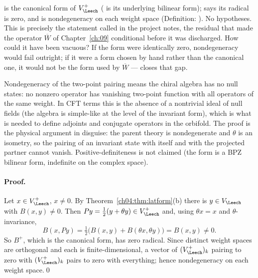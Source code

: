 \begin{dictionary}
 is the canonical form of $V_\Leech^+$ ( is its underlying bilinear
form);  says its radical is zero, and  is
nondegeneracy on each weight space (Definition: ). No hypotheses. This is
precisely the statement called  in the project notes, the residual that made the operator
$\overline W$ of Chapter~\ref{ch:09} conditional before it was discharged. How could it have been
vacuous? If the form were identically zero, nondegeneracy would fail outright; if it were a form
chosen by hand rather than the canonical one, it would not be the form used by $\overline W$ ---
 closes that gap.
\end{dictionary}

\begin{physics}
Nondegeneracy of the two-point pairing means the chiral algebra has no null states: no nonzero operator has vanishing two-point function with all operators of the same weight. In CFT terms this is the absence of a nontrivial ideal of null fields (the algebra is simple-like at the level of the invariant form), which is what is needed to define adjoints and conjugate operators in the orbifold. The proof is the physical argument in disguise: the parent theory is nondegenerate and $\theta$ is an isometry, so the pairing of an invariant state with itself and with the projected partner cannot vanish. Positive-definiteness is not claimed (the form is a BPZ bilinear form, indefinite on the complex space).
\end{physics}

\paragraph{Proof.} Let $x\in V_\Leech^+$, $x\neq0$. By Theorem~\ref{ch04:thm:latform}(b) there is $y\in V_\Leech$
with $B(x,y)\neq0$. Then $Py=\tfrac12(y+\theta y)\in V_\Leech^+$ and, using $\theta x=x$ and
$\theta$-invariance,
\begin{equation*}
  B(x,Py)=\tfrac12\big(B(x,y)+B(\theta x,\theta y)\big)=B(x,y)\neq0 .
\end{equation*}
So $B^+$, which is the canonical form, has zero radical. Since distinct weight spaces are orthogonal
and each is finite-dimensional, a vector of $(V_\Leech^+)_k$ pairing to zero with $(V_\Leech^+)_k$ pairs
to zero with everything; hence nondegeneracy on each weight space.\qed

